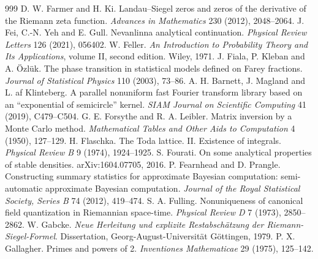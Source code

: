 \begin{thebibliography}{999}
 D. W. Farmer and H. Ki. Landau--Siegel zeros and zeros of the derivative of the Riemann zeta function. \emph{Advances in Mathematics} 230 (2012), 2048--2064.
 J. Fei, C.-N. Yeh and E. Gull. Nevanlinna analytical continuation. \emph{Physical Review Letters} 126 (2021), 056402.
 W. Feller. \emph{An Introduction to Probability Theory and Its Applications}, volume II, second edition. Wiley, 1971.
 J. Fiala, P. Kleban and A. \"Ozl\"uk. The phase transition in statistical models defined on Farey fractions. \emph{Journal of Statistical Physics} 110 (2003), 73--86.
 A. H. Barnett, J. Magland and L. af Klinteberg. A parallel nonuniform fast Fourier transform library based on an ``exponential of semicircle'' kernel. \emph{SIAM Journal on Scientific Computing} 41 (2019), C479--C504.
 G. E. Forsythe and R. A. Leibler. Matrix inversion by a Monte Carlo method. \emph{Mathematical Tables and Other Aids to Computation} 4 (1950), 127--129.
 H. Flaschka. The Toda lattice. II. Existence of integrals. \emph{Physical Review B} 9 (1974), 1924--1925.
 S. Fourati. On some analytical properties of stable densities. arXiv:1604.07705, 2016.
 P. Fearnhead and D. Prangle. Constructing summary statistics for approximate Bayesian computation: semi-automatic approximate Bayesian computation. \emph{Journal of the Royal Statistical Society, Series B} 74 (2012), 419--474.
 S. A. Fulling. Nonuniqueness of canonical field quantization in Riemannian space-time. \emph{Physical Review D} 7 (1973), 2850--2862.
 W. Gabcke. \emph{Neue Herleitung und explizite Restabsch\"atzung der Riemann-Siegel-Formel}. Dissertation, Georg-August-Universit\"at G\"ottingen, 1979.
 P. X. Gallagher. Primes and powers of 2. \emph{Inventiones Mathematicae} 29 (1975), 125--142.

\end{thebibliography}
